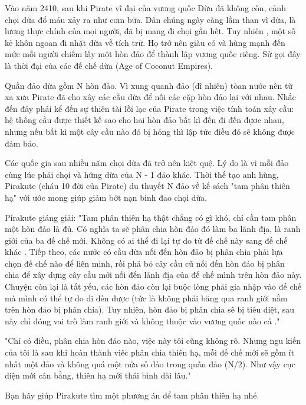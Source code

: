 Vào năm 2410, sau khi Pirate vĩ đại của vương quốc Dừa đã không còn, cảnh chọi dừa đổ máu xảy ra như cơm bữa. Dân chúng ngày càng lầm than vì dừa, là lương thực chính của mọi người, đã bị mang đi chọi gần hết. Tuy nhiên , một số kẻ khôn ngoan đi nhặt dừa về tích trữ. Họ trở nên giàu có và hùng mạnh đến mức mỗi người chiếm lấy một hòn đảo để thành lập vương quốc riêng. Sử gọi đây là thời đại của các đế chế dừa (Age of Coconut Empires).  

   Quần đảo dừa gồm N hòn đảo. Vì xung quanh đảo (dĩ nhiên) tòan nước nên từ xa xưa Pirate đã cho xây các cầu dừa để nối các cặp hòn đảo lại với nhau. Nhắc đến đây phải kể đến sự thiên tài lỗi lạc của Pirate trong việc tính toán xây cầu: hệ thống cầu được thiết kế sao cho hai hòn đảo bất kì đến đi đến đựơc nhau, nhưng nếu bất kì một cây cầu nào đó bị hỏng thì lập tức điều đó sẽ không được đảm bảo.  

   Các quốc gia sau nhiều năm chọi dừa đã trở nên kiệt quệ. Lý do là vì mỗi đảo cùng lúc phải chọi và hứng dừa của N - 1 đảo khác. Thời thế tạo anh hùng, Pirakute (cháu 10 đời của Pirate) du thuyết N đảo về kế sách "tam phân thiên hạ" với ước mong giúp giảm bớt nạn binh đao chọi dừa.  

   Pirakute giảng giải: "Tam phân thiên hạ thật chẳng có gì khó, chỉ cần tam phân một hòn đảo là đủ. Có nghĩa ta sẽ phân chia hòn đảo đó làm ba lãnh địa, là ranh giới của ba đế chế mới.   Không có ai thể đi lại tự do từ đế chế này sang đế chế khác   . Tiếp theo, các nước có cầu dừa nối đến hòn đảo bị phân chia phải lựa chọn đế chế nào để liên minh, rồi phá bỏ cây cầu cũ nối đến hòn đảo bị phân chia để xây dựng cây cầu mới nối đến lãnh địa của đế chế mình trên hòn đảo này. Chuyện còn lại là tất yếu, các hòn đảo còn lại buộc lòng phải gia nhập vào đế chế mà mình có thể tự do đi đến được (tức là   không phải băng qua ranh giới   nằm trên hòn đảo bị phân chia). Tuy nhiên, hòn đảo bị phân chia sẽ bị tiêu diệt, sau này chỉ đóng vai trò làm ranh giới và   không thuộc vào vương quốc nào cả   ."  

   "Chỉ có điều, phân chia hòn đảo nào, việc này tôi cũng không rõ. Nhưng ngu kiến của tôi là sau khi hoàn thành viêc phân chia thiên hạ, mỗi đế chế mới sẽ gồm ít nhất một đảo và không quá một nửa số đảo trong quần đảo (N/2). Như vậy cục diện mới cân bằng, thiên hạ mới thái bình dài lâu."  

   Bạn hãy giúp Pirakute tìm một phương án để tam phân thiên hạ nhé.